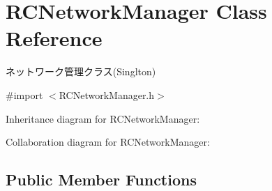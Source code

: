 \hypertarget{interface_r_c_network_manager}{\section{R\-C\-Network\-Manager Class Reference}
\label{interface_r_c_network_manager}
}


ネットワーク管理クラス(\-Singlton)  




{\ttfamily \#import $<$R\-C\-Network\-Manager.\-h$>$}



Inheritance diagram for R\-C\-Network\-Manager\-:


Collaboration diagram for R\-C\-Network\-Manager\-:
\subsection*{Public Member Functions}
